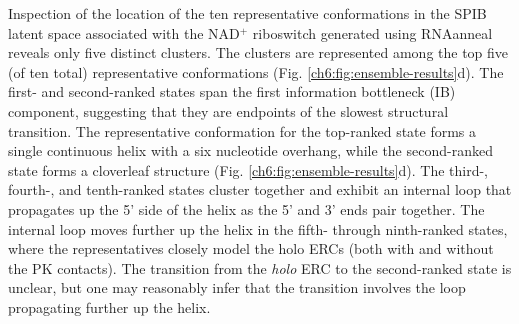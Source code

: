 Inspection of the location of the ten representative conformations in the SPIB latent space associated with the NAD$^{+}$ riboswitch generated using RNAanneal reveals only five distinct clusters. The clusters are represented among the top five (of ten total) representative conformations (Fig. \ref{ch6:fig:ensemble-results}d). The first- and second-ranked states span the first information bottleneck (IB) component, suggesting that they are endpoints of the slowest structural transition. The representative conformation for the top-ranked state forms a single continuous helix with a six nucleotide overhang, while the second-ranked state forms a cloverleaf structure (Fig. \ref{ch6:fig:ensemble-results}d). The third-, fourth-, and tenth-ranked states cluster together and exhibit an internal loop that propagates up the 5' side of the helix as the 5' and 3' ends pair together. The internal loop moves further up the helix in the fifth- through ninth-ranked states, where the representatives closely model the holo ERCs (both with and without the PK contacts). The transition from the {\it holo} ERC to the second-ranked state is unclear, but one may reasonably infer that the transition involves the loop propagating further up the helix.





